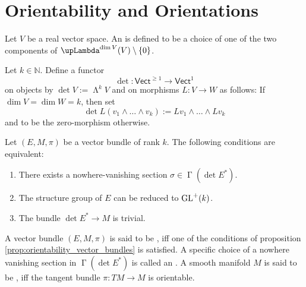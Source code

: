 \section*{Orientability and Orientations}

\begin{definition}[Orientation]
	Let $V$ be a real vector space. An  is defined to be a choice of one of the two components of $\upLambda^{\dim V}(V) \setminus \cbr{0}$.  
\end{definition}

\begin{definition}
	Let $k \in \mathbb{N}$. Define a functor 
	\begin{equation*}
		\det : \mathsf{Vect}^{\geq 1} \to \mathsf{Vect}^1
	\end{equation*}
	\noindent on objects by $\det V := \upLambda^k V$ and on morphisms $L : V \to W$ as follows: If $\dim V = \dim W = k$, then set
	\begin{equation*}
		\det L(v_1 \wedge \dots \wedge v_k) := Lv_1 \wedge \dots \wedge Lv_k
	\end{equation*}
	\noindent and to be the zero-morphism otherwise.
\end{definition}

\begin{proposition}
	\label{prop:orientability_vector_bundles}
	Let $(E,M,\pi)$ be a vector bundle of rank $k$. The following conditions are equivalent:
	\begin{enumerate}[label=\textup{(\alph*)},leftmargin = *]
		\item There exists a nowhere-vanishing section $\sigma \in \upGamma(\det E^*)$.
		\item The structure group of $E$ can be reduced to $\operatorname{GL}^+(k)$.
		\item The bundle $\det E^* \to M$ is trivial.
	\end{enumerate}
\end{proposition}

\begin{definition}[Orientability]
	A vector bundle $(E,M,\pi)$ is said to be , iff one of the conditions of proposition \ref{prop:orientability_vector_bundles} is satisfied. A specific choice of a nowhere vanishing section in $\upGamma(\det E^*)$ is called an . A smooth manifold $M$ is said to be ,  iff the tangent bundle $\pi : TM \to M$ is orientable.
\end{definition}

